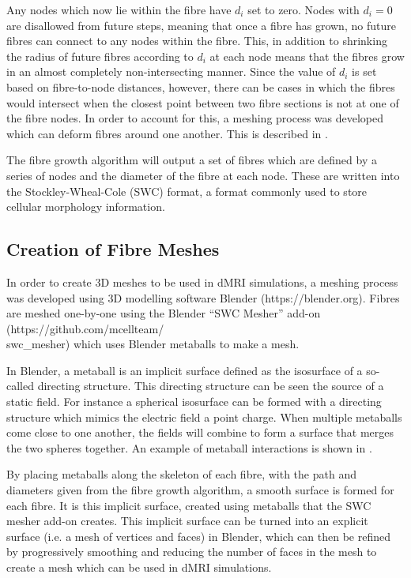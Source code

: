 Any nodes which now lie within the fibre have $d_i$ set to zero. 
Nodes with $d_i = 0$ are disallowed from future steps, meaning that once a fibre has grown, no future fibres can connect to any nodes within the fibre. 
This, in addition to shrinking the radius of future fibres according to $d_i$ at each node means that the fibres grow in an almost completely  non-intersecting manner.
Since the value of $d_i$ is set based on fibre-to-node distances, however, there can be cases in which the fibres would intersect when the closest point between two fibre sections is not at one of the fibre nodes.
In order to account for this, a meshing process was developed which can deform fibres around one another. This is described in .


The fibre growth algorithm will output a set of fibres which are defined by a series of nodes and the diameter of the fibre at each node.
These are written into the Stockley-Wheal-Cole (SWC) format\cite{Stockley1993}, a format commonly used to store cellular morphology information.   
\vspace{-1em}
\subsection{Creation of Fibre Meshes}
\label{sec:creation_of_fibre_meshses}
In order to create 3D meshes to be used in dMRI simulations, a meshing process was developed using 3D modelling software Blender (https://blender.org).
Fibres are meshed one-by-one using the Blender “SWC Mesher” add-on  (https://github.com/mcellteam/\\swc\_mesher) which uses Blender metaballs to make a mesh.

In Blender, a metaball is an implicit surface defined as the isosurface of a so-called directing structure. 
This directing structure can be seen the source of a static field. For instance a spherical isosurface can be formed with a directing structure which mimics the electric field a point charge.
When multiple metaballs come close to one another, the fields will combine to form a surface that merges the two spheres together.
An example of metaball interactions is shown in .

By placing metaballs along the skeleton of each fibre, with the path and diameters given from the fibre growth algorithm, a smooth surface is formed for each fibre.
It is this implicit surface, created using metaballs that the SWC mesher add-on creates. 
This implicit surface can be turned into an explicit surface (i.e. a mesh of vertices and faces) in Blender, which can then be refined by progressively smoothing and reducing the number of faces in the mesh to create a mesh which can be used in dMRI simulations. 

